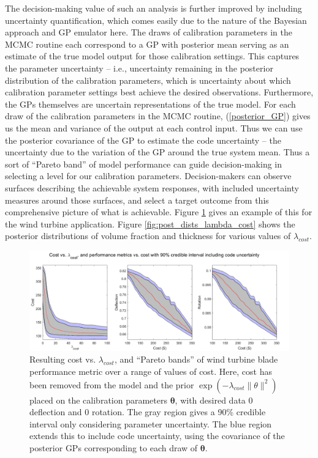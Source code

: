 \documentclass{article}
\begin{document}
The decision-making value of such an analysis is further improved by including uncertainty quantification, which comes easily due to the nature of the Bayesian approach and GP emulator here. The draws of calibration parameters in the MCMC routine each correspond to a GP with posterior mean serving as an estimate of the true model output for those calibration settings. This captures the parameter uncertainty -- i.e., uncertainty remaining in the posterior distribution of the calibration parameters, which is uncertainty about which calibration parameter settings best achieve the desired observations. Furthermore, the GPs themselves are uncertain representations of the true model. For each draw of the calibration parameters in the MCMC routine, (\ref{posterior_GP}) gives us the mean and variance of the output at each control input. Thus we can use the posterior covariance of the GP to estimate the code uncertainty -- the uncertainty due to the variation of the GP around the true system mean. Thus a sort of ``Pareto band'' of model performance can guide decision-making in selecting a level for our calibration parameters. Decision-makers can observe surfaces describing the achievable system responses, with included uncertainty measures around those surfaces, and select a target outcome from this comprehensive picture of what is achievable. Figure \ref{fig:non-uniform_prior} gives an example of this for the wind turbine application. Figure \ref{fig:post_dists_lambda_cost} shows the posterior distributions of volume fraction and thickness for various values of $\lambda_{cost}$. 

\begin{figure}
\centering
\captionsetup{width=.9\linewidth}
\includegraphics[width=\linewidth]{FIG_cost_lambda_code_uncert_upd}
\caption{Resulting cost vs. $\lambda_{cost}$, and ``Pareto bands'' of wind turbine blade performance metric over a range of values of cost. Here, cost has been removed from the model and the prior $\exp(-\lambda_{cost}\lVert \theta \rVert^2)$ placed on the calibration parameters $\boldsymbol \theta$, with desired data 0 deflection and 0 rotation. The gray region gives a 90\% credible interval only considering parameter uncertainty. The blue region extends this to include code uncertainty, using the covariance of the posterior GPs corresponding to each draw of $\boldsymbol \theta$.}
\label{fig:non-uniform_prior}
\end{figure}
\end{document}
